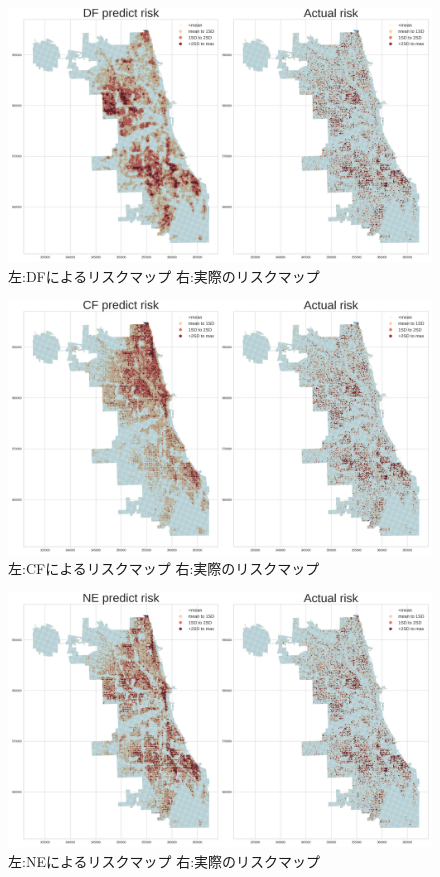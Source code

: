 \begin{figure}
  \centering %
  \includegraphics[scale=0.25]{./add-crime-timeseries-fig/DF_riskmap.png}
  \caption{左:DFによるリスクマップ 右:実際のリスクマップ}
  \label{fig:add-crime-timeseries-df-risk}
\end{figure}

\begin{figure}
  \centering %
  \includegraphics[scale=0.25]{./add-crime-timeseries-fig/CF_riskmap.png}
  \caption{左:CFによるリスクマップ 右:実際のリスクマップ}
  \label{fig:add-crime-timeseries-cf-risk}
\end{figure}

\begin{figure}
  \centering %
  \includegraphics[scale=0.25]{./add-crime-timeseries-fig/NE_riskmap.png}
  \caption{左:NEによるリスクマップ 右:実際のリスクマップ}
  \label{fig:add-crime-timeseries-ne-risk}
\end{figure}

